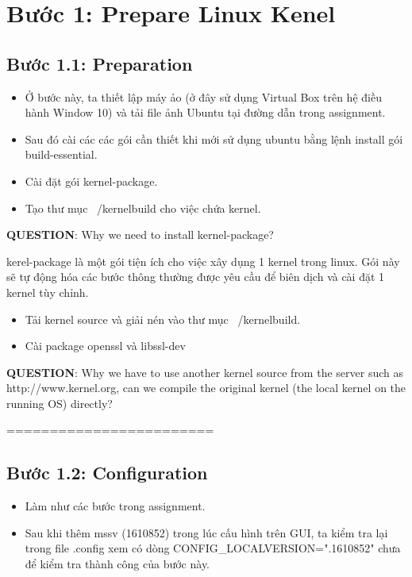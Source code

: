 \section{Bước 1: Prepare Linux Kenel}

\subsection{Bước 1.1: Preparation}

\begin{itemize}
	\item Ở bước này, ta thiết lập máy ảo (ở đây sử dụng Virtual Box trên hệ điều hành Window 10) và tải file ảnh Ubuntu tại đường dẫn trong assignment.
	\item Sau đó cài các các gói cần thiết khi mới sử dụng ubuntu bằng lệnh install gói build-essential.
	\item Cài đặt gói kernel-package.
	\item Tạo thư mục ~/kernelbuild cho việc chứa kernel.
\end{itemize}


\textbf{QUESTION}: Why we need to install kernel-package?

\vspace{0.2cm}

kerel-package là một gói tiện ích cho việc xây dụng 1 kernel trong linux. Gói này sẽ tự động hóa các bước thông thường được yêu cầu để biên dịch và cài đặt 1 kernel tùy chỉnh.

\begin{itemize}
	\item Tải kernel source và giải nén vào thư mục ~/kernelbuild.
	\item Cài package openssl và libssl-dev
\end{itemize}




\textbf{QUESTION}:  Why we have to use another kernel source from the server such as http://www.kernel.org, can we compile the original kernel (the local kernel on the running OS) directly?

\vspace{0.2cm}

========================


\subsection{Bước 1.2: Configuration}

\begin{itemize}
	\item Làm như các bước trong assignment.
	\item Sau khi thêm mssv (1610852) trong lúc cấu hình trên GUI, ta kiểm tra lại trong file .config xem có dòng CONFIG\_LOCALVERSION=".1610852" chưa để kiểm tra thành công của bước này.
\end{itemize}


